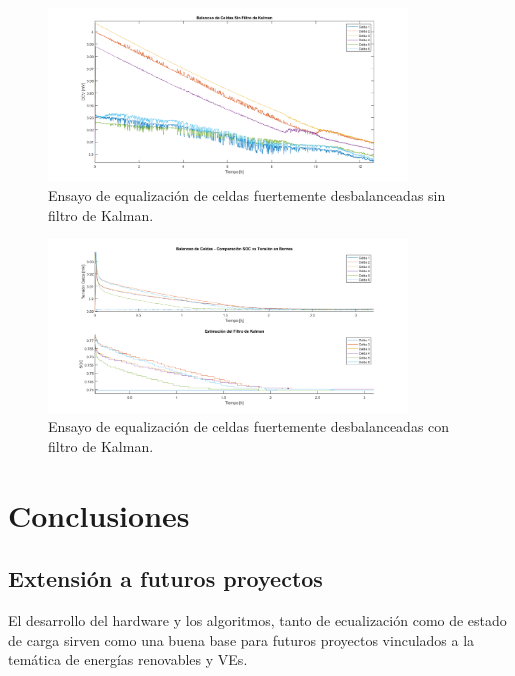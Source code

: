 \documentclass[10pt, a4paper]{article}
\begin{document}
\begin{figure}[h!]
	\begin{center}
		\includegraphics[width=0.85\textwidth]{SF_Balancing_19_03_2019_F.png}
		\caption{Ensayo de equalización de celdas fuertemente desbalanceadas sin filtro de Kalman.}
		\label{Test_BQ76_1}
	\end{center}
\end{figure}
\FloatBarrier

\begin{figure}[h!]
	\begin{center}
		\includegraphics[width=0.85\textwidth]{MRG_loading_26_3_F.png}
		\caption{Ensayo de equalización de celdas fuertemente desbalanceadas con filtro de Kalman.}
		\label{Test_BQ76_2}
	\end{center}
\end{figure}
\FloatBarrier

\newpage

\section{Conclusiones}\label{conclusiones}

\subsection{Extensión a futuros proyectos}

El desarrollo del hardware y los algoritmos, tanto de ecualización como de
estado de carga sirven como una buena base para futuros proyectos vinculados a
la temática de energías renovables y \acrshort{VE}s.
\end{document}
